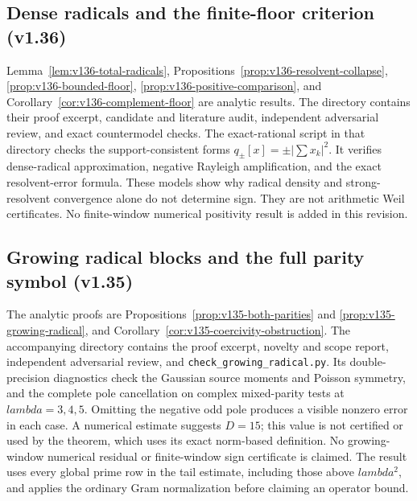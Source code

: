 \documentclass[11pt]{article}
\def\lambda{lambda}%
\theoremstyle{remark}
\begin{document}
\subsection{Dense radicals and the finite-floor criterion (v1.36)}
Lemma~\ref{lem:v136-total-radicals},
Propositions~\ref{prop:v136-resolvent-collapse},
\ref{prop:v136-bounded-floor}, \ref{prop:v136-positive-comparison}, and
Corollary~\ref{cor:v136-complement-floor} are analytic results. The directory
 contains their proof excerpt, candidate and
literature audit, independent adversarial review, and exact countermodel
checks. The exact-rational script in that directory checks the support-consistent forms
$q_\pm[x]=\pm|\sum x_k|^2$. It verifies dense-radical approximation,
negative Rayleigh amplification, and the exact resolvent-error formula.
These models show why radical density and strong-resolvent convergence
alone do not determine sign. They are not arithmetic Weil certificates.
No finite-window numerical positivity result is added in this revision.

\subsection{Growing radical blocks and the full parity symbol (v1.35)}
The analytic proofs are Propositions~\ref{prop:v135-both-parities} and
\ref{prop:v135-growing-radical}, and
Corollary~\ref{cor:v135-coercivity-obstruction}.  The accompanying directory
 contains the proof excerpt, novelty and
scope report, independent adversarial review, and
\texttt{check\_growing\_radical.py}.  Its double-precision diagnostics check
the Gaussian source moments and Poisson symmetry, and the complete pole
cancellation on complex mixed-parity tests at $\lambda=3,4,5$.
Omitting the negative odd pole produces a visible nonzero error in each
case.  A numerical estimate suggests $D=15$; this value is not certified
or used by the theorem, which uses its exact norm-based definition.
No growing-window numerical residual or finite-window sign certificate is
claimed.  The result uses every global prime row in the tail estimate,
including those above $\lambda^2$, and applies the ordinary Gram
normalization before claiming an operator bound.
\end{document}
